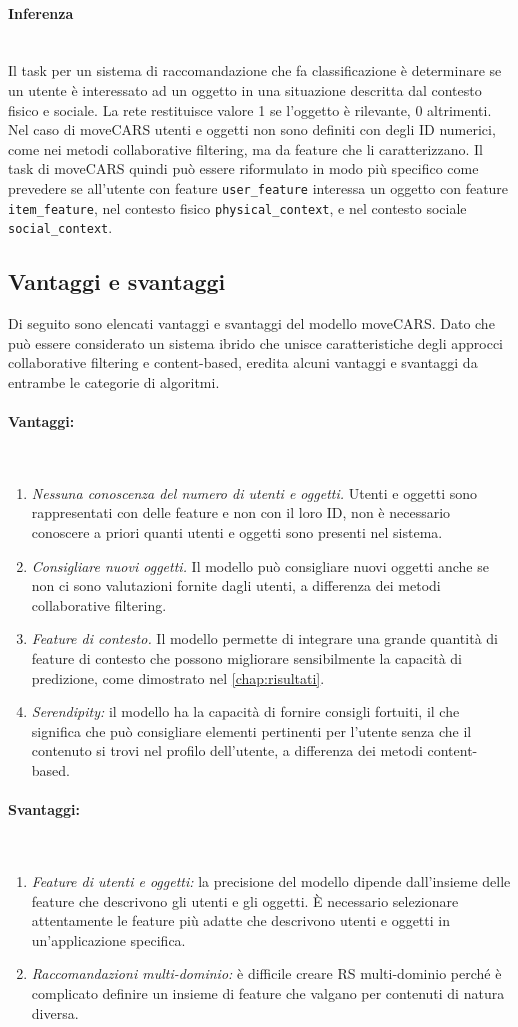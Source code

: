 \documentclass[12pt,italian]{report}
\newcommand{\myparagraph}[1]{\paragraph{#1}\mbox{}\\} %
\begin{document}
\myparagraph{Inferenza}
Il task per un sistema di raccomandazione che fa classificazione è determinare se un utente è interessato ad un oggetto in una situazione descritta dal contesto fisico e sociale. La rete restituisce valore 1 se l'oggetto è rilevante, 0 altrimenti. Nel caso di moveCARS utenti e oggetti non sono definiti con degli ID numerici, come nei metodi collaborative filtering, ma da feature che li caratterizzano. Il task di moveCARS quindi può essere riformulato in modo più specifico come prevedere se all'utente con feature \texttt{user\_feature} interessa un oggetto con feature \texttt{item\_feature}, nel contesto fisico \texttt{physical\_context}, e nel contesto sociale \texttt{social\_context}.

\subsection{Vantaggi e svantaggi}
Di seguito sono elencati vantaggi e svantaggi del modello moveCARS. Dato che può essere considerato un sistema ibrido che unisce caratteristiche degli approcci collaborative filtering e content-based, eredita alcuni vantaggi e svantaggi da entrambe le categorie di algoritmi.

\myparagraph{Vantaggi:}
\begin{enumerate}
 \item \textit{Nessuna conoscenza del numero di utenti e oggetti.} Utenti e oggetti sono rappresentati con delle feature e non con il loro ID, non è necessario conoscere a priori quanti utenti e oggetti sono presenti nel sistema.
 \item \textit{Consigliare nuovi oggetti.} Il modello può consigliare nuovi oggetti anche se non ci sono valutazioni fornite dagli utenti, a differenza dei metodi collaborative filtering.
 \item \textit{Feature di contesto.} Il modello permette di integrare una grande quantità di feature di contesto che possono migliorare sensibilmente la capacità di predizione, come dimostrato nel \autoref{chap:risultati}.
 \item \textit{Serendipity:} il modello ha la capacità di fornire consigli fortuiti, il che significa che può consigliare elementi pertinenti per l'utente senza che il contenuto si trovi nel profilo dell'utente, a differenza dei metodi content-based.
\end{enumerate}

\myparagraph{Svantaggi:}
\begin{enumerate}
 \item \textit{Feature di utenti e oggetti:} la precisione del modello dipende dall'insieme delle feature che descrivono gli utenti e gli oggetti. \`E necessario selezionare attentamente le feature più adatte che descrivono utenti e oggetti in un'applicazione specifica.
  
 \item \textit{Raccomandazioni multi-dominio:} è difficile creare RS multi-dominio perché è complicato definire un insieme di feature che valgano per contenuti di natura diversa.
\end{enumerate}
\end{document}
